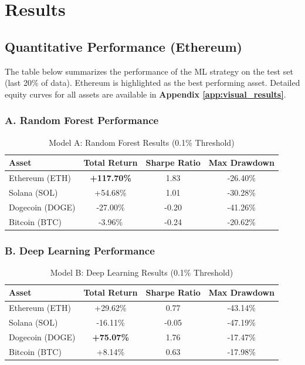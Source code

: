 \documentclass[11pt,a4paper]{article}
\begin{document}
\section{Results}
\label{sec:results}

\subsection{Quantitative Performance (Ethereum)}
The table below summarizes the performance of the ML strategy on the test set (last 20\% of data). Ethereum is highlighted as the best performing asset. Detailed equity curves for all assets are available in \textbf{Appendix \ref{app:visual_results}}.

\subsubsection{A. Random Forest Performance}
\begin{table}[H]
\centering
\caption{Model A: Random Forest Results (0.1\% Threshold)}
\label{tab:rf_performance}
\begin{tabular}{|l|c|c|c|}
\hline
\textbf{Asset} & \textbf{Total Return} & \textbf{Sharpe Ratio} & \textbf{Max Drawdown} \\
\hline
Ethereum (ETH) & \textbf{+117.70\%} & 1.83 & -26.40\% \\
Solana (SOL) & +54.68\% & 1.01 & -30.28\% \\
Dogecoin (DOGE) & -27.00\% & -0.20 & -41.26\% \\
Bitcoin (BTC) & -3.96\% & -0.24 & -20.62\% \\
\hline
\end{tabular}
\end{table}

\subsubsection{B. Deep Learning Performance}
\begin{table}[H]
\centering
\caption{Model B: Deep Learning Results (0.1\% Threshold)}
\label{tab:dl_performance}
\begin{tabular}{|l|c|c|c|}
\hline
\textbf{Asset} & \textbf{Total Return} & \textbf{Sharpe Ratio} & \textbf{Max Drawdown} \\
\hline
Ethereum (ETH) & +29.62\% & 0.77 & -43.14\% \\
Solana (SOL) & -16.11\% & -0.05 & -47.19\% \\
Dogecoin (DOGE) & \textbf{+75.07\%} & 1.76 & -17.47\% \\
Bitcoin (BTC) & +8.14\% & 0.63 & -17.98\% \\
\hline
\end{tabular}
\end{table}
\end{document}
